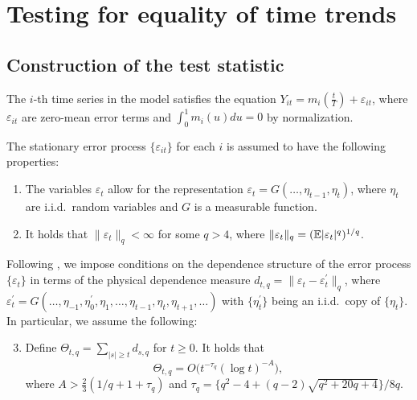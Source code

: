 \documentclass[a4paper,12pt]{article}
\begin{document}
\section{Testing for equality of time trends}\label{sec-test-equality}



\subsection{Construction of the test statistic}\label{subsec-test-equality-stat}

The $i$-th time series in the model satisfies the equation $Y_{it} = m_i(\frac{t}{T}) + \varepsilon_{it}$, where $\varepsilon_{it}$ are zero-mean error terms and $\int_0^1 m_i(u) du = 0$ by normalization.

The stationary error process $\{\varepsilon_{it}\}$ for each $i$ is assumed to have the following properties:

\begin{enumerate}[label=(C\arabic*),leftmargin=1.05cm]

\item \label{C-err1} The variables $\varepsilon_t$ allow for the representation $\varepsilon_t = G(\ldots,\eta_{t-1},\eta_t)$, where $\eta_t$ are i.i.d.\ random variables and $G$ is a measurable function. 

\item \label{C-err2} It holds that $\| \varepsilon_t \|_q < \infty$ for some $q > 4$, where $\| \varepsilon_t \|_q = (\mathbb{E}|\varepsilon_t|^q)^{1/q}$. 

\end{enumerate}

Following \cite{Wu2005}, we impose conditions on the dependence structure of the error process $\{\varepsilon_t\}$ in terms of the physical dependence measure $d_{t,q} = \| \varepsilon_t - \varepsilon_t^\prime \|_q$, where $\varepsilon_t^\prime = G(\ldots,\eta_{-1},\eta_0^\prime,\eta_1,\ldots,\eta_{t-1},\eta_t,\eta_{t+1},\ldots)$ with $\{\eta_t^\prime\}$ being an i.i.d.\ copy of $\{\eta_t\}$. In particular, we assume the following: 
\begin{enumerate}[label=(C\arabic*),leftmargin=1.05cm]
\setcounter{enumi}{2}
\item \label{C-err3} Define $\Theta_{t,q} = \sum\nolimits_{|s| \ge t} d_{s,q}$ for $t \ge 0$. It holds that 
\[ \Theta_{t,q} = O \big( t^{-\tau_q} (\log t)^{-A} \big), \]
where $A > \frac{2}{3} (1/q + 1 + \tau_q)$ and $\tau_q = \{q^2 - 4 + (q-2) \sqrt{q^2 + 20q + 4}\} / 8q$. 
\end{enumerate}
\end{document}
